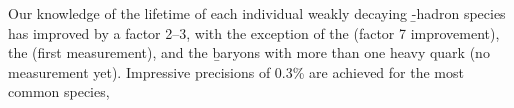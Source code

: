 %
% 
%   
%
%
%
%
Our knowledge of the lifetime of each individual weakly decaying \b-hadron species 
has improved by a factor 2--3, with the exception of the
\Xibd (factor 7 improvement), the \Xibu (first measurement), and 
the \b baryons with more than one heavy quark (no measurement yet). 
Impressive precisions of 0.3\% are achieved for the most common species, 
